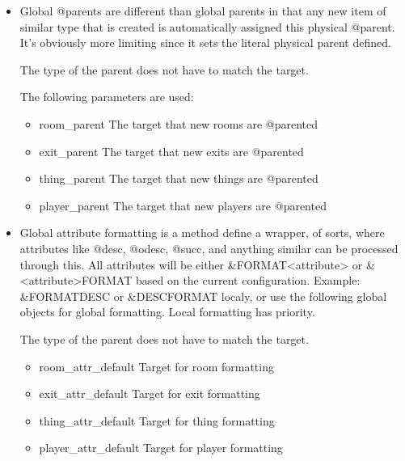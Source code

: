 \documentclass[letterpaper,10pt,english]{sphinxmanual}
\begin{document}
\begin{itemize}
\item {} 
\sphinxAtStartPar
Global @parents are different than global parents in that any new
item of similar type that is created is automatically assigned this
physical @parent.  It’s obviously more limiting since it sets
the literal physical parent defined.

\sphinxAtStartPar
The type of the parent does not have to match the target.

\sphinxAtStartPar
The following parameters are used:
\begin{itemize}
\item {} 
\sphinxAtStartPar
room\_parent           \sphinxhyphen{} The target that new rooms are @parented

\item {} 
\sphinxAtStartPar
exit\_parent           \sphinxhyphen{} The target that new exits are @parented

\item {} 
\sphinxAtStartPar
thing\_parent          \sphinxhyphen{} The target that new things are @parented

\item {} 
\sphinxAtStartPar
player\_parent         \sphinxhyphen{} The target that new players are @parented

\end{itemize}

\item {} 
\sphinxAtStartPar
Global attribute formatting is a method define a wrapper, of sorts,
where attributes like @desc, @odesc, @succ, and anything similar
can be processed through this.  All attributes will be either
\&FORMAT\textless{}attribute\textgreater{} or \&\textless{}attribute\textgreater{}FORMAT based on the current
configuration.  Example: \&FORMATDESC or \&DESCFORMAT localy, or
use the following global objects for global formatting.  Local
formatting has priority.

\sphinxAtStartPar
The type of the parent does not have to match the target.
\begin{itemize}
\item {} 
\sphinxAtStartPar
room\_attr\_default     \sphinxhyphen{} Target for room formatting

\item {} 
\sphinxAtStartPar
exit\_attr\_default     \sphinxhyphen{} Target for exit formatting

\item {} 
\sphinxAtStartPar
thing\_attr\_default    \sphinxhyphen{} Target for thing formatting

\item {} 
\sphinxAtStartPar
player\_attr\_default   \sphinxhyphen{} Target for player formatting

\end{itemize}

\end{itemize}
\end{document}
